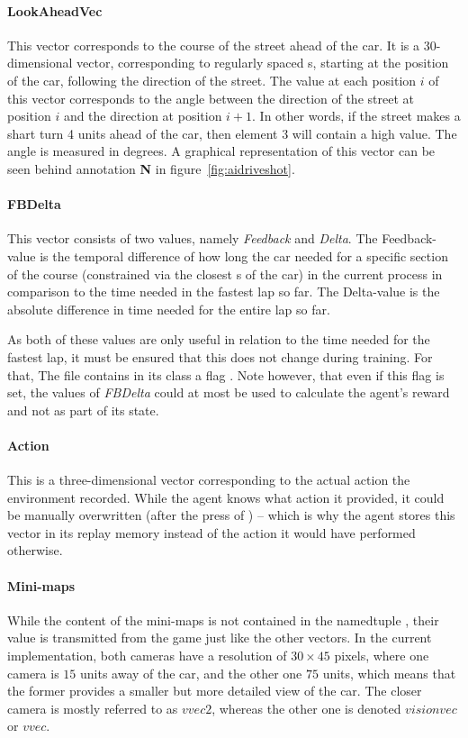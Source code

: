 \paragraph{LookAheadVec} This vector corresponds to the course of the street ahead of the car. It is a 30-dimensional vector, corresponding to regularly spaced s, starting at the position of the car, following the direction of the street. The value at each position $i$ of this vector corresponds to the angle between the direction of the street at position $i$ and the direction at position $i+1$. In other words, if the street makes a shart turn 4 units ahead of the car, then element $3$ will contain a high value. The angle is measured in degrees. A graphical representation of this vector can be seen behind annotation \textbf{N} in figure~\ref{fig:aidriveshot}.

\paragraph{FBDelta} This vector consists of two values, namely \emph{Feedback} and \emph{Delta}. The Feedback-value is the temporal difference of how long the car needed for a specific section of the course (constrained via the closest s of the car) in the current process in comparison to the time needed in the fastest lap so far. The Delta-value is the absolute difference in time needed for the entire lap so far.

As both of these values are only useful in relation to the time needed for the fastest lap, it must be ensured that this does not change during training. For that, The file  contains in its class  a flag . Note however, that even if this flag is set, the values of \emph{FBDelta} could at most be used to calculate the agent's reward and not as part of its state.

\paragraph{Action} This is a three-dimensional vector corresponding to the actual action the environment recorded. While the agent knows what action it provided, it could be manually overwritten (after the press of ) -- which is why the agent stores this vector in its replay memory instead of the action it would have performed otherwise.


\paragraph{Mini-maps} While the content of the mini-maps is not contained in the namedtuple , their value is transmitted from the game just like the other vectors. In the current implementation, both cameras have a resolution of $30\times45$ pixels, where one camera is $15$ units away of the car, and the other one $75$ units, which means that the former provides a smaller but more detailed view of the car. The closer camera is mostly referred to as $vvec2$, whereas the other one is denoted $visionvec$ or $vvec$.\\

